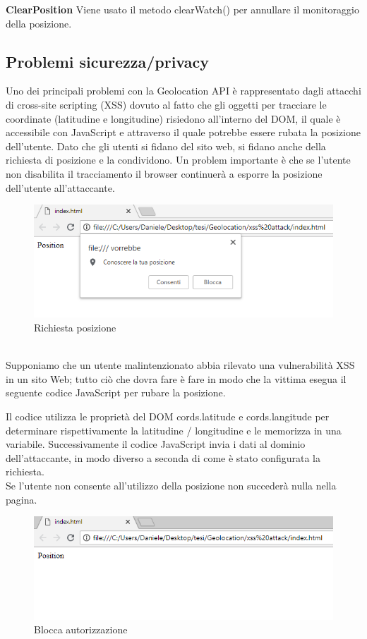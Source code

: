 \documentclass[11pt ,a4paper , twoside , openright ]{article}
\begin{document}
\textbf{ClearPosition}
Viene usato il metodo clearWatch() per annullare il monitoraggio della posizione.


\subsection{Problemi sicurezza/privacy}
Uno dei principali problemi con la Geolocation API è rappresentato dagli attacchi di cross-site scripting (XSS) dovuto al fatto che gli oggetti per tracciare le coordinate (latitudine e longitudine) risiedono all'interno del DOM, il quale è accessibile con JavaScript e attraverso il quale potrebbe essere rubata la posizione dell'utente. 
Dato che gli utenti si fidano del sito web, si fidano anche della richiesta di posizione e la condividono.
Un problem importante è che se l'utente non disabilita il tracciamento il browser continuerà a esporre la posizione dell'utente all'attaccante.
\begin{figure}[h]
	\centering
	\includegraphics[width=1\linewidth]{pos1}
	\caption{Richiesta posizione}
	\label{fig: Richiesta posizione}
\end{figure}
\\
Supponiamo che un utente malintenzionato abbia rilevato una vulnerabilità XSS in un sito Web; tutto ciò che dovra fare è fare in modo che la vittima esegua il seguente codice JavaScript per rubare la posizione.

Il codice utilizza le proprietà del DOM cords.latitude e cords.langitude per determinare rispettivamente la latitudine / longitudine e le memorizza in una variabile. Successivamente il codice JavaScript invia i dati al dominio dell'attaccante, in modo diverso a seconda di come è stato configurata la richiesta.
\\
Se l'utente non consente all'utilizzo della posizione non succederà nulla nella pagina.
\begin{figure}[h]
	\centering
	\includegraphics[width=1\linewidth]{Blocca}
	\caption{Blocca autorizzazione}
	\label{fig: Blocca autorizzazione}
\end{figure}
\end{document}
